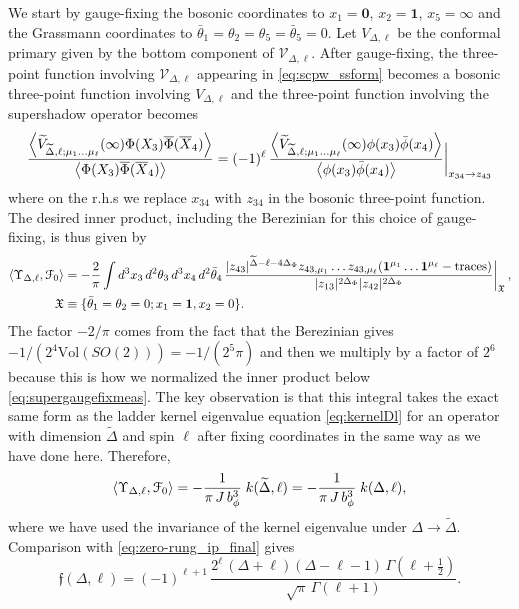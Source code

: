\documentclass[11pt]{article}
\newcommand{\thetab}{\bar{\theta}}
\newcommand{\phib}{\bar{\phi}}
\begin{document}
We start by gauge-fixing the bosonic coordinates to $x_{1} = \mathbf{0}$, $x_{2} = \mathbf{1}$, $x_{5} = \infty$ and the Grassmann coordinates to $\thetab_{1} = \theta_{2} = \theta_{5} = \thetab_{5}=0$. Let $V_{\Delta,\ell}$ be the conformal primary given by the bottom component of $\mathcal{V}_{\Delta,\ell}$. After gauge-fixing, the three-point function involving $\mathcal{V}_{\Delta,\ell}$ appearing in \eqref{eq:scpw_ssform} becomes a bosonic three-point function involving $V_{\Delta,\ell}$ and the three-point function involving the supershadow operator becomes
%
\begin{equation}\label{eq:3ptfn_gaugefix}
\frac{\expval{\widetilde{V}_{\widetilde{\Delta},\ell;\mu_{1}\ldots\mu_{\ell}}(\infty)\Phi(X_{3})\overline{\Phi}(\overline{X}_{4})}}{\expval{\Phi(X_{3})\overline{\Phi}(\overline{X}_{4})}} 
= (-1)^{\ell} \,
	\frac{\expval{\widetilde{V}_{\widetilde{\Delta},\ell;\mu_{1}\ldots\mu_{\ell}}(\infty)\phi(x_{3})\phib(x_{4})}}{\expval{\phi(x_{3})\phib(x_{4})}}\bigg|_{x_{34} \to z_{43}}
\end{equation}
%
where on the r.h.s we replace $x_{34}$ with $z_{34}$ in the bosonic three-point function. The desired inner product, including the Berezinian for this choice of gauge-fixing, is thus given by
%
\begin{equation}\label{eq:zero-rungip_shadow}
\begin{split}
\expval{\Upsilon_{\Delta,\ell},\mathcal{F}_{0}} 
&= 
	-\frac{2}{\pi}
	\int d^{3}x_{3}\,d^{2}\theta_{3}\,d^{3}x_{4}\,d^{2}\thetab_{4}\,
		\frac{|z_{43}|^{\widetilde{\Delta}-\ell-4\Delta_{\Phi}}z_{43,\mu_{1}} \ldots z_{43,\mu_{\ell}}(\mathbf{1}^{\mu_{1}}\ldots\mathbf{1}^{\mu_{\ell}}-\mathrm{traces})}{|z_{13}|^{2\Delta_{\Phi}}|z_{42}|^{2\Delta_{\Phi}}}\bigg|_\mathfrak{X} \,, \\
\mathfrak{X} 
&\equiv 
	\{\thetab_{1}=\theta_{2}=0;x_{1} = \mathbf{1},x_{2}=0\}.		
\end{split}
\end{equation}
%
The factor $-2/\pi$ comes from the fact that the Berezinian gives $-1/(2^{4}\mathrm{Vol}(SO(2))) = -1/(2^{5}\pi)$ and then we multiply by a factor of $2^{6}$ because this is how we normalized the inner product below \eqref{eq:supergaugefixmeas}. The key observation is that this integral takes the exact same form as the ladder kernel eigenvalue equation \eqref{eq:kernelDl} for an operator with dimension $\widetilde{\Delta}$ and spin $\ell$ after fixing coordinates in the same way as we have done here. Therefore,
% 
\begin{equation}\label{eq:zero-rungip_shadow_final}
\expval{\Upsilon_{\Delta,\ell},\mathcal{F}_{0}} = 
	-\frac{1}{\pi\, J \,b_{\phi}^{3}} \; k(\widetilde{\Delta},\ell) = -\frac{1}{\pi \,J\, b_{\phi}^{3}} \; k(\Delta,\ell),
\end{equation}
%
where we have used the invariance of the kernel eigenvalue under $\Delta \to \widetilde{\Delta}$. Comparison with \eqref{eq:zero-rung_ip_final} gives
%
\begin{equation}\label{eq:fnorm}
\mathfrak{f}(\Delta,\ell) = (-1)^{\ell+1} \, \frac{2^{\ell}\, (\Delta+\ell)(\Delta-\ell-1)\,\Gamma\left(\ell+\frac{1}{2}\right)}{\sqrt{\pi}\,\Gamma(\ell+1)}.
\end{equation}
%
\end{document}
